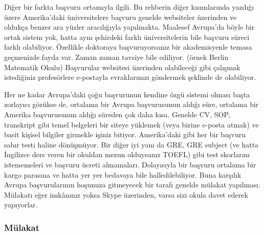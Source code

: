 \documentclass[12pt]{article}
\begin{document}
Diğer bir farkta başvuru ortamıyla ilgili. Bu rehberin diğer kısımlarında yazdığı üzere Amerika'daki üniversitelere başvuru genelde websiteler üzerinden ve oldukça benzer ara yüzler aracılığıyla yapılmakta. Maalesef Avrupa'da böyle bir ortak sistem yok, hatta aynı şehirdeki farklı üniversitelerin bile başvuru süreci farklı olabiliyor. Özellikle doktoraya başvuruyorsanız bir akademisyenle temasa geçmenizde fayda var. Zaman zaman tavsiye bile ediliyor. (örnek Berlin Matematik Okulu) Başvurular websitesi üzerinden olabileceği gibi çalışmak istediğiniz profesörlere e-postayla evraklarınızı göndermek şeklinde de olabiliyor. 

Her ne kadar Avrupa'daki çoğu başvurunun kendine özgü sistemi olması başta zorlayıcı gözükse de, ortalama bir Avrupa başvurusunun aldığı süre, ortalama bir Amerika başvurusunun aldığı süreden çok daha kısa. Genelde CV, SOP, transkript gibi temel belgeleri bir siteye yüklemek (veya birine e-posta atmak) ve basit kişisel bilgiler girmekle işiniz bitiyor. Amerika'daki gibi her bir başvuru sabır testi haline dönüşmüyor. Bir diğer iyi yanı da GRE, GRE subject (ve hatta İngilizce ders veren bir okuldan mezun olduysanız TOEFL) gibi test skorlarını istememeleri ve başvuru ücreti almamaları. Dolayısıyla bir başvuru ortalama bir kargo parasına ve hatta yer yer bedavaya bile halledilebiliyor. Buna karşılık Avrupa başvurularının hoşunuza gitmeyecek bir tarafı genelde mülakat yapılması. Mülakatı eğer imkânınız yoksa Skype üzerinden, varsa sizi okula davet ederek yapıyorlar. 

\subsubsection{Mülakat}
\end{document}

